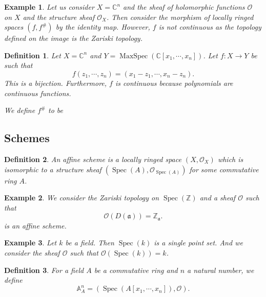 \documentclass{article}
\newtheorem{definition}{Definition}[section]
\newtheorem{example}{Example}[section]
\numberwithin{equation}{section}
\DeclareMathOperator{\Spec}{Spec}
\DeclareMathOperator{\MaxSpec}{MaxSpec}
\begin{document}
\begin{example}
Let us consider $X=\mathbb{C}^n$ and the sheaf of holomorphic functions $\mathcal{O}$ on $X$ and the structure sheaf $\mathcal{O}_X$. Then consider the morphism of locally ringed spaces $(f,f^{\#})$ by the identity map. However, $f$ is not continuous as the topology defined on the image is the Zariski topology.
\end{example}

\begin{definition}
Let $X=\mathbb{C}^n$ and $Y=\MaxSpec(\mathbb{C}[x_1,\cdots,x_n])$. Let $f:X\to Y$ be such that
\begin{equation*}
f(z_1,\cdots,z_n) = (x_1-z_1,\cdots,x_n-z_n).
\end{equation*}
This is a bijection. Furthermore, $f$ is continuous because polynomials are continuous functions. \\%
\par We define $f^{\#}$ to be 
\end{definition}

\subsection{Schemes}

\begin{definition}
An affine scheme is a locally ringed space $(X,\mathcal{O}_X)$ which is isomorphic to a structure sheaf $(\Spec(A),\mathcal{O}_{\Spec(A)})$ for some commutative ring $A$. %
\end{definition}

\begin{example}
We consider the Zariski topology on $\Spec(\mathbb{Z})$ and a sheaf $\mathcal{O}$ such that
\begin{equation*}
\mathcal{O}(D(\mathfrak{a})) = \mathbb{Z}_{\mathfrak{a}}.
\end{equation*}
is an affine scheme.
\end{example}

\begin{example}
Let $k$ be a field. Then $\Spec(k)$ is  a single point set. And we consider the sheaf $\mathcal{O}$ such that $\mathcal{O}(\Spec(k))=k$. 
\label{field_spec}
\end{example}

\begin{definition}For a field $A$ be a commutative ring and $n$ a natural number, we define
\begin{equation*}
\mathbb{A}^n_A=(\Spec(A[x_1,\cdots,x_n]),\mathcal{O}).
\end{equation*}
\end{definition}
\end{document}
